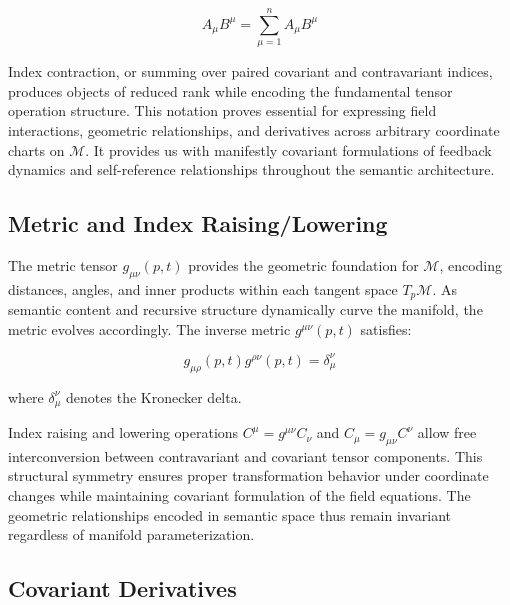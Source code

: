 \begin{equation}
A_\mu B^\mu = \sum_{\mu=1}^n A_\mu B^\mu
\end{equation}

Index contraction, or summing over paired covariant and contravariant indices, produces objects of reduced rank while encoding the fundamental tensor operation structure. This notation proves essential for expressing field interactions, geometric relationships, and derivatives across arbitrary coordinate charts on \(\mathcal{M}\). It provides us with manifestly covariant formulations of feedback dynamics and self-reference relationships throughout the semantic architecture.

\subsection{Metric and Index Raising/Lowering}
\label{2.4.2:metric_and_index_raising_lowering}

The metric tensor \(g_{\mu\nu}(p,t)\) provides the geometric foundation for \(\mathcal{M}\), encoding distances, angles, and inner products within each tangent space \(T_p\mathcal{M}\). As semantic content and recursive structure dynamically curve the manifold, the metric evolves accordingly. The inverse metric \(g^{\mu\nu}(p,t)\) satisfies:

\begin{equation}
g_{\mu\rho}(p,t) g^{\rho\nu}(p,t) = \delta_\mu^\nu
\end{equation}

where \(\delta_\mu^\nu\) denotes the Kronecker delta.

Index raising and lowering operations \(C^\mu = g^{\mu\nu} C_\nu\) and \(C_\mu = g_{\mu\nu} C^\nu\) allow free interconversion between contravariant and covariant tensor components. This structural symmetry ensures proper transformation behavior under coordinate changes while maintaining covariant formulation of the field equations. The geometric relationships encoded in semantic space thus remain invariant regardless of manifold parameterization.


\subsection{Covariant Derivatives}
\label{2.4.3:covariant_derivatives}

